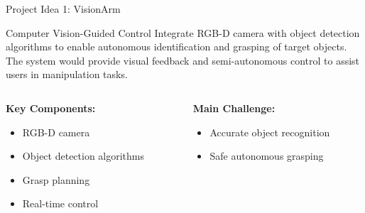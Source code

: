 \documentclass{beamer}
\begin{document}
\begin{frame}{Project Idea 1: VisionArm}
    \begin{block}{Computer Vision-Guided Control}
        Integrate RGB-D camera with object detection algorithms to enable autonomous identification and grasping of target objects. The system would provide visual feedback and semi-autonomous control to assist users in manipulation tasks.
    \end{block}

    \vspace{0.5cm}

    \begin{columns}[T]
        \begin{column}{0.5\textwidth}
            \textbf{Key Components:}
            \begin{itemize}
                \item RGB-D camera
                \item Object detection algorithms
                \item Grasp planning
                \item Real-time control
            \end{itemize}
        \end{column}

        \begin{column}{0.5\textwidth}
            \textbf{Main Challenge:}
            \begin{itemize}
                \item Accurate object recognition
                \item Safe autonomous grasping
            \end{itemize}
        \end{column}
    \end{columns}
\end{frame}
\end{document}
